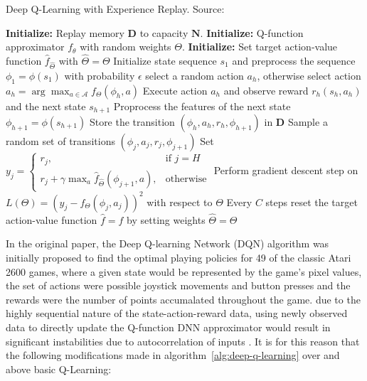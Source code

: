 \documentclass{mldsmsc}
\begin{document}
\begin{algorithm}
    \caption{Deep Q-Learning with Experience Replay. Source: \citep{RefWorks:mnih2015human-level}}
    \label{alg:deep-q-learning}
    \begin{algorithmic}[1]
        \State \textbf{Initialize:} Replay memory $\mathbf{D}$ to capacity $\mathbf{N}$.
        \State \textbf{Initialize:} Q-function approximator $f_{\theta}$ with random weights $\Theta$.
        \State \textbf{Initialize:} Set target action-value function $\hat{f}_{\hat{\Theta}}$ with $\hat{\Theta} = \Theta$
            \State Initialize state sequence $s_1$ and preprocess the sequence $\phi_1 = \phi(s_1)$
                \State with probability $\epsilon$ select a random action $a_h$,
                otherwise select action $a_h = \arg\max_{a \in \mathcal{A}} f_{\Theta}(\phi_h, a)$
                \State Execute action $a_h$ and observe reward $r_h(s_h, a_h)$ and the next state $s_{h+1}$
                \State Proprocess the features of the next state $\phi_{h+1} = \phi(s_{h+1})$
                \State Store the transition $(\phi_{h}, a_h, r_h, \phi_{h+1})$ in $\mathbf{D}$
                \State Sample a random set of transitions $(\phi_{j}, a_j, r_j, \phi_{j+1})$
                \State Set $y_j = \begin{cases} r_j, & \text{if } j=H\\ r_j + \gamma \max_{a} \hat{f}_{\hat{\Theta}}(\phi_{j+1},a), & \text{otherwise} \end{cases}$
                \State Perform gradient descent step on $L(\Theta) = \left(y_j - f_{\Theta}(\phi_j,a_j)\right)^2$ with respect to $\Theta$
                \State Every $C$ steps reset the target action-value function $\hat{f} = f$ by setting weights $\hat{\Theta} = \Theta$
            \EndFor
        \EndFor
    \end{algorithmic}
\end{algorithm}

In the original paper, the Deep Q-learning Network (DQN) algorithm was initially proposed to find the optimal
playing policies for 49 of the classic Atari 2600 games, where a given state would be represented by the game's
pixel values, the set of actions were possible joystick movements and button presses and the rewards were the number
of points accumalated throughout the game. \cite{RefWorks:mnih2015human-level} due to the highly sequential nature of
the state-action-reward data, using newly observed data to directly update the Q-function DNN approximator
would result in significant instabilities due to autocorrelation of inputs \citep{RefWorks:mnih2015human-level}.
It is for this reason that the following modifications made in algorithm~\ref{alg:deep-q-learning} over and above
basic Q-Learning:
\end{document}
